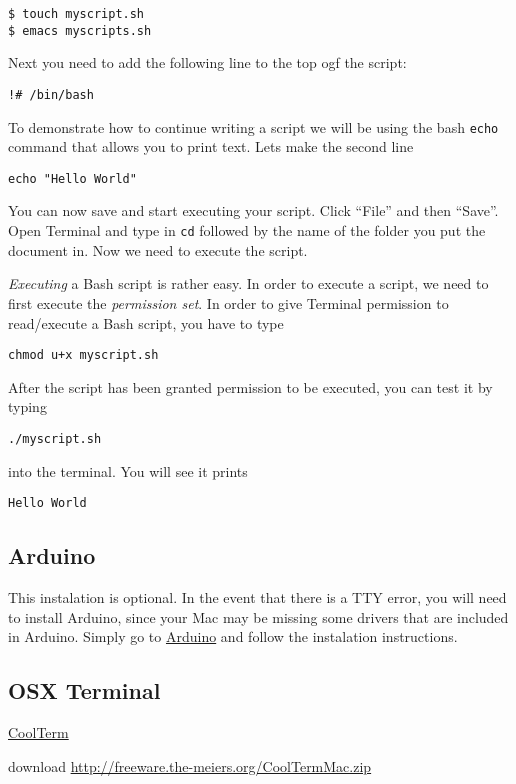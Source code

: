 \begin{verbatim}
$ touch myscript.sh
$ emacs myscripts.sh
\end{verbatim}

Next you need to add the following line to the top ogf the script:

\begin{verbatim}
!# /bin/bash
\end{verbatim}

To demonstrate how to continue writing a script we will be using the
bash \texttt{echo} command that allows you to print text. Lets make the
second line

\begin{verbatim}
echo "Hello World"
\end{verbatim}

You can now save and start executing your script. Click ``File'' and
then ``Save''. Open Terminal and type in \texttt{cd} followed by the
name of the folder you put the document in. Now we need to execute the
script.

\emph{Executing} a Bash script is rather easy. In order to execute a
script, we need to first execute the \emph{permission set}. In order to
give Terminal permission to read/execute a Bash script, you have to type

\begin{verbatim}
chmod u+x myscript.sh
\end{verbatim}

After the script has been granted permission to be executed, you can
test it by typing

\begin{verbatim}
./myscript.sh
\end{verbatim}

into the terminal. You will see it prints

\begin{verbatim}
Hello World
\end{verbatim}

\subsection{Arduino}\label{arduino}

This instalation is optional. In the event that there is a TTY error,
you will need to install Arduino, since your Mac may be missing some
drivers that are included in Arduino. Simply go to
\href{https://www.arduino.cc/en/guide/macOSX}{Arduino} and follow the
instalation instructions.

\subsection{OSX Terminal}\label{osx-terminal}

\href{https://learn.sparkfun.com/tutorials/terminal-basics/coolterm-windows-mac-linux}{CoolTerm}

download \url{http://freeware.the-meiers.org/CoolTermMac.zip}
